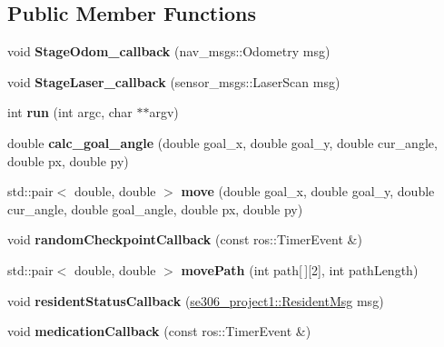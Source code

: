 \subsection*{Public Member Functions}
\begin{DoxyCompactItemize}
\item 
\hypertarget{classDoctor_a92b20f52198c6137d8858152cba77640}{void {\bfseries Stage\-Odom\-\_\-callback} (nav\-\_\-msgs\-::\-Odometry msg)}\label{classDoctor_a92b20f52198c6137d8858152cba77640}

\item 
\hypertarget{classDoctor_ab0b46ba92bd2069733f304858b7e4495}{void {\bfseries Stage\-Laser\-\_\-callback} (sensor\-\_\-msgs\-::\-Laser\-Scan msg)}\label{classDoctor_ab0b46ba92bd2069733f304858b7e4495}

\item 
\hypertarget{classDoctor_a1fe9c9a74bd4d2044b7217ec82ae9e60}{int {\bfseries run} (int argc, char $\ast$$\ast$argv)}\label{classDoctor_a1fe9c9a74bd4d2044b7217ec82ae9e60}

\item 
\hypertarget{classDoctor_a55fe6c06a3ce07fd9014a03000df43db}{double {\bfseries calc\-\_\-goal\-\_\-angle} (double goal\-\_\-x, double goal\-\_\-y, double cur\-\_\-angle, double px, double py)}\label{classDoctor_a55fe6c06a3ce07fd9014a03000df43db}

\item 
\hypertarget{classDoctor_ada60bb6625be46966ff86f7af9d05366}{std\-::pair$<$ double, double $>$ {\bfseries move} (double goal\-\_\-x, double goal\-\_\-y, double cur\-\_\-angle, double goal\-\_\-angle, double px, double py)}\label{classDoctor_ada60bb6625be46966ff86f7af9d05366}

\item 
\hypertarget{classDoctor_a21ac6188dd7f5890ff1a633cf700144d}{void {\bfseries random\-Checkpoint\-Callback} (const ros\-::\-Timer\-Event \&)}\label{classDoctor_a21ac6188dd7f5890ff1a633cf700144d}

\item 
\hypertarget{classDoctor_aed76815aa67aec25e8ff86a55e4ac4f1}{std\-::pair$<$ double, double $>$ {\bfseries move\-Path} (int path\mbox{[}$\,$\mbox{]}\mbox{[}2\mbox{]}, int path\-Length)}\label{classDoctor_aed76815aa67aec25e8ff86a55e4ac4f1}

\item 
\hypertarget{classDoctor_af4d24247a3f59b1b3b5258938e019086}{void {\bfseries resident\-Status\-Callback} (\hyperlink{structse306__project1_1_1ResidentMsg__}{se306\-\_\-project1\-::\-Resident\-Msg} msg)}\label{classDoctor_af4d24247a3f59b1b3b5258938e019086}

\item 
\hypertarget{classDoctor_a26ae14986239ea67147a52235685e31e}{void {\bfseries medication\-Callback} (const ros\-::\-Timer\-Event \&)}\label{classDoctor_a26ae14986239ea67147a52235685e31e}

\end{DoxyCompactItemize}
